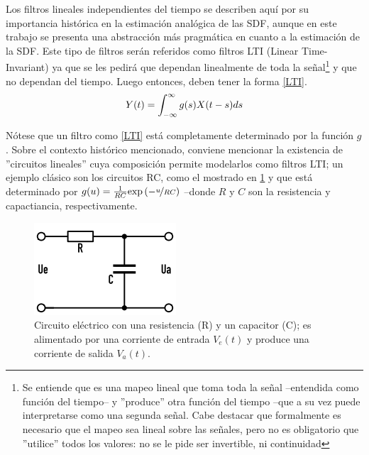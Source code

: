 Los filtros  
lineales independientes del tiempo se describen aqu\'i por su importancia hist\'orica en la 
estimaci\'on anal\'ogica de las SDF,
aunque en este trabajo se presenta
una abstracci\'on m\'as pragm\'atica en cuanto a la estimaci\'on de la SDF.
Este tipo de filtros ser\'an referidos como filtros LTI (Linear Time-Invariant)
ya que se les pedir\'a que dependan linealmente de toda la se\~nal\footnote{Se
entiende que es una mapeo lineal que toma toda la se\~nal --entendida como funci\'on del tiempo--
y ''produce'' otra funci\'on del tiempo --que a su vez puede interpretarse como una segunda 
se\~nal. Cabe
destacar que formalmente es necesario que el mapeo sea lineal sobre las se\~nales, pero no es 
obligatorio que ''utilice'' todos los valores: no se le pide ser invertible, ni continuidad}
y que no dependan del tiempo. Luego entonces, deben tener la forma \ref{LTI}.
\begin{equation*}
Y(t) = \int_{-\infty}^{\infty} g(s) X(t-s) ds
\label{LTI}
\end{equation*}

N\'otese que un filtro como \ref{LTI} est\'a completamente determinado por la funci\'on $g$. 
Sobre el contexto hist\'orico mencionado, conviene mencionar la existencia de ''circuitos 
lineales'' cuya composici\'on permite modelarlos como filtros LTI; un ejemplo cl\'asico
son los circuitos RC, como el mostrado en \ref{rrcc} y que est\'a determinado por
$g(u) = \frac{1}{R C} \text{exp}\left( -\nicefrac{u}{R C} \right)$ --donde $R$ y $C$ son la
resistencia y capactiancia, respectivamente.

\begin{figure}
\centering
\includegraphics[width=0.4\linewidth]{rc.png} 
\caption{Circuito el\'ectrico con una resistencia (R) y un capacitor (C); es alimentado por
una corriente de entrada $V_e(t)$ y produce una corriente de salida $V_a(t)$. 
}
\label{rrcc}
\end{figure}

